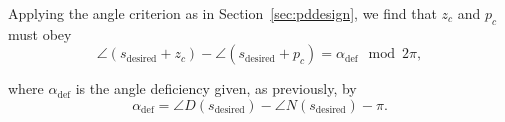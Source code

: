\documentclass[a4paper,11pt]{report}
\theoremstyle{definition}
\newcommand{\des}{\textrm{desired}}
\begin{document}


Applying the angle criterion as in Section~\ref{sec:pddesign}, we
find that $z_c$ and $p_c$ must obey
\begin{equation}
  \label{eq:lead}
  \angle(s_\des+z_c)-\angle(s_\des+p_c) = \alpha_\mathrm{def} \mod 2\pi,
\end{equation}

where $\alpha_\mathrm{def}$ is the angle deficiency given, as
previously, by
\[
\alpha_\mathrm{def}= \angle D(s_\des)-\angle N(s_\des) - \pi.
\]
\end{document}
